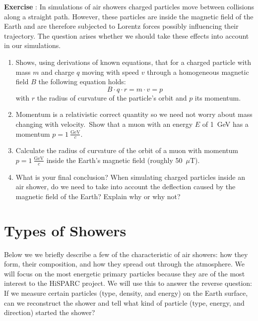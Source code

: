 \documentclass[12pt,a4paper]{article}
\numberwithin{equation}{section}
\numberwithin{figure}{section}
\newcounter{Exercise}
\numberwithin{table}{section}
\begin{document}
\begin{shaded}
\textbf{Exercise \theExercise {}} : In simulations of air showers charged particles move between collisions along a straight path. However, these particles are inside the magnetic field of the Earth and are therefore subjected to Lorentz forces possibly influencing their trajectory. The question arises whether we should take these effects into account in our simulations.
\begin{enumerate}[-]
\item Shows, using derivations of known equations, that for a charged particle with mass $m$ and charge $q$ moving with speed $v$ through a homogeneous magnetic field $B$ the following equation holds:
\begin{equation}
B \cdot q \cdot r = m \cdot v = p
\end{equation}
with $r$ the radius of curvature of the particle's orbit and $p$ its momentum.
\item Momentum is a relativistic correct quantity so we need not worry about mass changing with velocity.\footnotemark~Show that a muon with an energy $E$ of 1~GeV has a momentum $p=1~\frac{\mbox{GeV}}{c}$.
\item Calculate the radius of curvature of the orbit of a muon with momentum $p=1~\frac{\mbox{GeV}}{c}$ inside the Earth's magnetic field (roughly 50~$\mu$T).
\item What is your final conclusion? When simulating charged particles inside an air shower, do we need to take into account the deflection caused by the magnetic field of the Earth? Explain why or why not?
\end{enumerate}\end{shaded}

\section{Types of Showers}
Below we we briefly describe a few of the characteristic of air showers: how they form, their composition, and how they spread out through the atmosphere. We will focus on the most energetic primary particles because they are of the most interest to the HiSPARC project. We will use this to answer the reverse question: If we measure certain particles (type, density, and energy) on the Earth surface, can we reconstruct the shower and tell what kind of particle (type, energy, and direction) started the shower?
\end{document}
